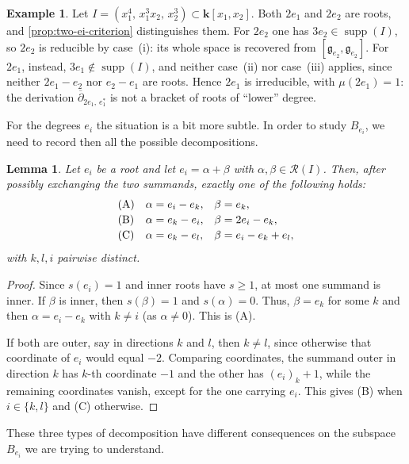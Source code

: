 \documentclass[11pt,letterpaper,reqno]{amsart}
\newtheorem{lemma}[lemma]{Lemma}
\theoremstyle{remark}
\theoremstyle{definition}
\newtheorem{example}[example]{Example}
\newcommand{\KK}[0]{\ensuremath{\mathbf{k}}}
\newcommand{\supp}[0]{\ensuremath{\operatorname{supp}}}
\begin{document}
\begin{example}\label{ex:two-ei}
Let $I=(x_1^4,\,x_1^3x_2,\,x_2^3)\subset\KK[x_1,x_2]$. Both $2e_1$ and $2e_2$ are roots, and
\cref{prop:two-ei-criterion} distinguishes them. For $2e_2$ one has
$3e_2\in\supp(I)$, so $2e_2$ is reducible by case~(i): its whole space is
recovered from $[\mathfrak g_{e_2},\mathfrak g_{e_2}]$. For $2e_1$, instead,
$3e_1\notin\supp(I)$, and neither case~(ii) nor case~(iii) applies, since
neither $2e_1-e_2$ nor $e_2-e_1$ are roots. Hence $2e_1$ is
irreducible, with $\mu(2e_1)=1$: the derivation $\overline\partial_{2e_1,\,e_1^*}$ is not a bracket of roots of ``lower'' degree.
\end{example}

For the degrees $e_i$ the situation is a bit more subtle. In order to study $B_{e_i}$, we need to record then all the possible decompositions.

\begin{lemma}\label{lem:ei-decompositions}
Let $e_i$ be a root and let $e_i=\alpha+\beta$ with
$\alpha,\beta\in\mathcal R(I)$. Then, after possibly exchanging the two
summands, exactly one of the following holds:
$$
\begin{array}{lll}
\textup{(A)} & \alpha=e_i-e_k, & \beta=e_k,\\[2pt]
\textup{(B)} & \alpha=e_k-e_i, & \beta=2e_i-e_k,\\[2pt]
\textup{(C)} & \alpha=e_k-e_l, & \beta=e_i-e_k+e_l,
\end{array}
$$
with $k,l,i$ pairwise distinct.
\end{lemma}

\begin{proof}
Since $s(e_i)=1$ and inner roots have $s\geq1$, at most one summand is inner. If $\beta$ is inner, then $s(\beta)=1$ and $s(\alpha)= 0$. Thus, $\beta=e_k$ for some $k$ and then $\alpha=e_i-e_k$
with $k\neq i$ (as $\alpha\neq0$). This is (A).

If both are outer, say in directions $k$ and $l$, then $k\neq l$, since otherwise that coordinate of
$e_i$ would equal $-2$. Comparing coordinates, the summand outer in direction $k$ has $k$-th coordinate $-1$ and the other has $(e_i)_k+1$, while the remaining coordinates vanish, except for the one carrying $e_i$.
This gives (B) when $i\in\{k,l\}$ and (C) otherwise.
\end{proof}

These three types of decomposition have different consequences on the subspace $B_{e_i}$ we are trying to understand.
\end{document}
